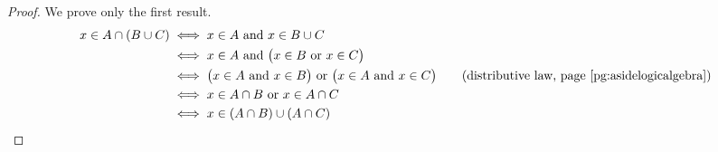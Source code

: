 % 


\begin{proof}
	We prove only the first result.
	\begin{align*}
		x\in A\cap(B\cup C) &\iff x\in A\text{ and }x\in B\cup C\\
		&\iff x\in A \text{ and }\bigl(x\in B\text{ or }x\in C\bigr)\\
		&\iff \bigl(x\in A \text{ and }x\in B\bigr)\text{ or }\bigl(x\in A\text{ and }x\in C\bigr) \tag{distributive law, page \pageref{pg:asidelogicalgebra}}\\
		&\iff x\in A\cap B\text{ or }x\in A\cap C\\
		&\iff x\in (A\cap B)\cup(A\cap C)\tag*{\qedhere}
	\end{align*}
\end{proof}

\goodbreak

